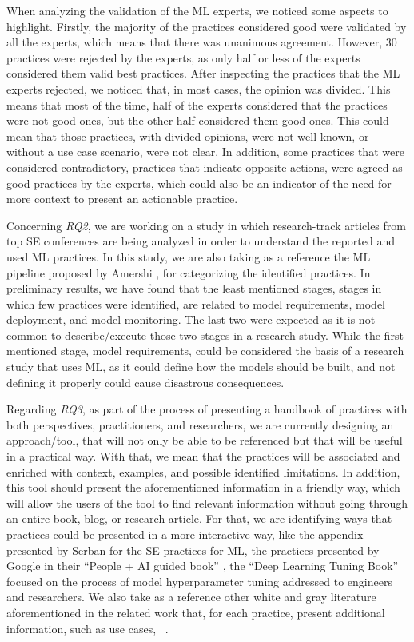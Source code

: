 When analyzing the validation of the ML experts, we noticed some  aspects to highlight. Firstly,  the majority of the practices considered good were validated by all the experts, which means that there was unanimous agreement. However, 30 practices were rejected by the experts, as only half or less of the experts considered them valid best practices. After inspecting the practices that the ML experts rejected, we noticed that, in most cases, the opinion was divided. This means that most of the time, half of the experts considered that the practices were not good ones, but the other half considered them good ones. This could mean that those practices, with divided opinions, were not well-known, or without a use case scenario, were not clear. In addition, some practices that were considered contradictory, \ie practices that indicate opposite actions, were agreed as good practices by the experts, which could also be an indicator of the need for more context to present an actionable practice. 

Concerning \textit{RQ2}, we are working on a study in which research-track  articles from top SE conferences are being analyzed in order to understand the reported and used ML practices. In this study, we are also taking as a reference the ML pipeline proposed by Amershi \etal \cite{amershi2019software}, for categorizing the identified practices. In preliminary results, we have found that the least mentioned stages, \ie stages in which few practices were identified, are related to model requirements, model deployment, and model monitoring. The last two were expected as it is not common to describe/execute those two stages in a research study. While the first mentioned stage, model requirements, could be considered the basis of a research study that uses ML, as it could define how the models should be built, and not defining it properly could cause disastrous consequences. 


Regarding  \textit{RQ3}, as part of the process of presenting a handbook of practices with both perspectives, practitioners, and researchers, we are currently designing an approach/tool, that will not only be able to be referenced but that will be useful in a practical way. With that, we mean that the practices will be associated and enriched with context, examples, and possible identified limitations.  In addition, this tool should present the aforementioned information in a friendly way, which will allow the users of the tool to find relevant information without going through an entire book, blog, or research article. For that, we are identifying ways  that  practices could be presented in a more interactive way,  like the appendix presented by Serban \etal \cite{serban2020adoption} for the SE practices for ML, the practices presented by Google in their  ``People + AI guided book'' \cite{goole_pair},  the ``Deep Learning Tuning Book''\cite{google_play_book} focused on the process of  model hyperparameter tuning addressed to engineers and researchers. We also take as a reference other white and gray literature aforementioned in the related work that, for each practice, present additional information, such as use cases, \eg~\cite{wujek2016best, ArpQuiPen_22}.



\iffalse


\fi